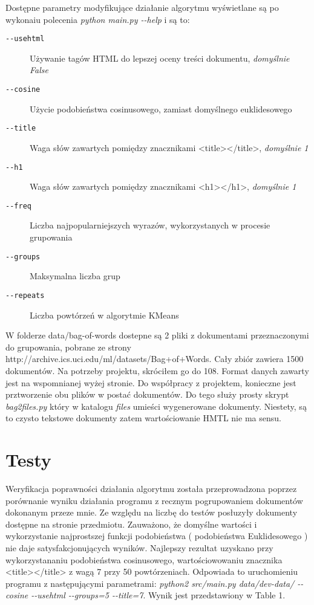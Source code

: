 \documentclass{article}
\begin{document}
Dostępne parametry modyfikujące działanie algorytmu wyświetlane są po wykonaiu polecenia \emph{python main.py -{}-help} i są to:
\begin{description}
\item [\texttt{-{}-usehtml}] Używanie tagów HTML do lepszej oceny treści dokumentu, \emph{domyślnie False}
\item [\texttt{-{}-cosine}] Użycie podobieństwa cosinusowego, zamiast domyślnego euklidesowego
\item [\texttt{-{}-title}] Waga słów zawartych pomiędzy znacznikami <title></title>, \emph{domyślnie 1}
\item [\texttt{-{}-h1}] Waga słów zawartych pomiędzy znacznikami <h1></h1>, \emph{domyślnie 1}
\item [\texttt{-{}-freq}] Liczba najpopularniejszych wyrazów, wykorzystanych w procesie grupowania
\item [\texttt{-{}-groups}] Maksymalna liczba grup
\item [\texttt{-{}-repeats}] Liczba powtórzeń w algorytmie KMeans
\end{description}

W folderze data/bag-of-words dostepne są 2 pliki z dokumentami przeznaczonymi do grupowania, pobrane ze strony http://archive.ics.uci.edu/ml/datasets/Bag+of+Words. Cały zbiór zawiera 1500 dokumentów. Na potrzeby projektu, skróciłem go do 108. Format danych zawarty jest na wspomnianej wyżej stronie. Do współpracy z projektem, konieczne jest prztworzenie obu plików w postać dokumentów. Do tego służy prosty skrypt \emph{bag2files.py} który w katalogu \emph{files} umieści wygenerowane dokumenty. Niestety, są to czysto tekstowe dokumenty zatem wartościowanie HMTL nie ma sensu.

\section{Testy}
Weryfikacja poprawności działania algorytmu została przeprowadzona poprzez porównanie wyniku działania programu z recznym pogrupowaniem dokumentów dokonanym przeze mnie. Ze względu na liczbę do testów posłuzyły dokumenty dostępne na stronie przedmiotu. Zauważono, że domyślne wartości i wykorzystanie najprostszej funkcji podobieństwa ( podobieństwa Euklidesowego ) nie daje satysfakcjonujących wyników. Najlepszy rezultat uzyskano przy wykorzystananiu podobieństwa cosinusowego, wartościowowaniu znacznika <title></title> z wagą 7 przy 50 powtórzeniach. Odpowiada to uruchomieniu programu z następującymi parametrami: \emph{python2 src/main.py data/dev-data/ -{}-cosine -{}-usehtml -{}-groups=5  -{}-title=7}. Wynik jest przedstawiony w Table 1. 
\end{document}
